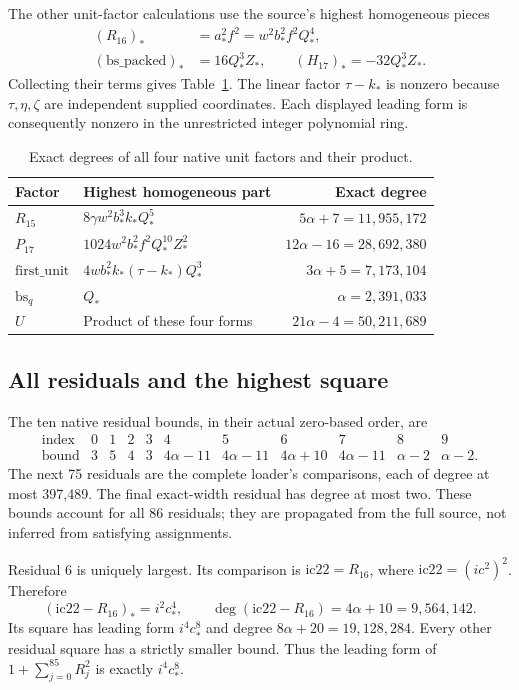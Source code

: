 \documentclass[11pt,letterpaper]{article}
\theoremstyle{definition}\newtheorem{definition}[theorem]{Definition}
\theoremstyle{remark}\newtheorem{remark}[theorem]{Remark}
\begin{document}
The other unit-factor calculations use the source's highest homogeneous pieces
\begin{align*}
 (R_{16})_*&=a_*^2f^2=w^2b_*^2f^2Q_*^4,\\
 (\mathrm{bs\_packed})_*&=16Q_*^3Z_*,\qquad
 (H_{17})_*=-32Q_*^3Z_*.
\end{align*}
Collecting their terms gives Table~\ref{fup:gp:tab:exactfactors}. The linear factor $\tau-k_*$ is nonzero because $\tau,\eta,\zeta$ are independent supplied coordinates. Each displayed leading form is consequently nonzero in the unrestricted integer polynomial ring.
\begin{table}[ht]
\centering\small
\begin{tabular}{llr}
\toprule
Factor & Highest homogeneous part & Exact degree\\\midrule
$R_{15}$ & $8\gamma w^2b_*^3k_*Q_*^5$ & $5\alpha+7=11,955,172$\\
$P_{17}$ & $1024w^2b_*^2f^2Q_*^{10}Z_*^2$ & $12\alpha-16=28,692,380$\\
$\mathrm{first\_unit}$ & $4wb_*^2k_*(\tau-k_*)Q_*^3$ & $3\alpha+5=7,173,104$\\
$\mathrm{bs}_q$ & $Q_*$ & $\alpha=2,391,033$\\\midrule
$U$ & Product of these four forms & $21\alpha-4=50,211,689$\\\bottomrule
\end{tabular}
\caption{Exact degrees of all four native unit factors and their product.}\label{fup:gp:tab:exactfactors}
\end{table}

\subsection{All residuals and the highest square}
The ten native residual bounds, in their actual zero-based order, are
\[
\begin{array}{c|rrrrrrrrrr}
\text{index}&0&1&2&3&4&5&6&7&8&9\\\hline
\text{bound}&3&5&4&3&4\alpha-11&4\alpha-11&4\alpha+10&4\alpha-11&\alpha-2&\alpha-2.
\end{array}
\]
The next 75 residuals are the complete loader's comparisons, each of degree at most 397,489. The final exact-width residual has degree at most two. These bounds account for all 86 residuals; they are propagated from the full source, not inferred from satisfying assignments.

Residual 6 is uniquely largest. Its comparison is $\mathrm{ic22}=R_{16}$, where $\mathrm{ic22}=(ic^2)^2$. Therefore
\[
 (\mathrm{ic22}-R_{16})_*=i^2c_*^4,\qquad
 \deg(\mathrm{ic22}-R_{16})=4\alpha+10=9,564,142.
\]
Its square has leading form $i^4c_*^8$ and degree $8\alpha+20=19,128,284$. Every other residual square has a strictly smaller bound. Thus the leading form of $1+\sum_{j=0}^{85}R_j^2$ is exactly $i^4c_*^8$.
\end{document}
